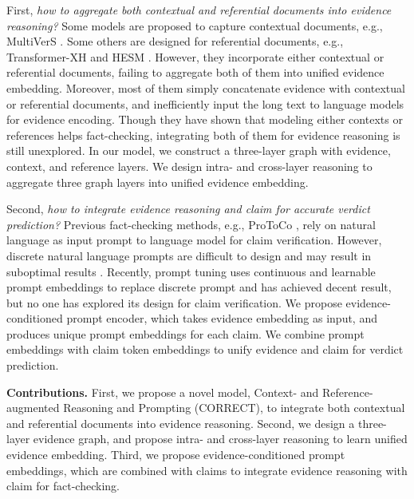 First, \emph{how to aggregate both contextual and referential documents into evidence reasoning?} Some models are proposed to capture contextual documents, e.g., MultiVerS \cite{multivers}. Some others are designed for referential documents, e.g., Transformer-XH \cite{transformer_xh} and HESM \cite{hesm}. However, they incorporate either contextual or referential documents, failing to aggregate both of them into unified evidence embedding. Moreover, most of them simply concatenate evidence with contextual or referential documents, and inefficiently input the long text to language models for evidence encoding. Though they have shown that modeling either contexts or references helps fact-checking, integrating both of them for evidence reasoning is still unexplored. In our model, we construct a three-layer graph with evidence, context, and reference layers. We design intra- and cross-layer reasoning to aggregate three graph layers into unified evidence embedding.

Second, \emph{how to integrate evidence reasoning and claim for accurate verdict prediction?} Previous fact-checking methods, e.g., ProToCo \cite{protoco}, rely on natural language as input prompt to language model for claim verification. However, discrete natural language prompts are difficult to design and may result in suboptimal results \cite{coop}. Recently, prompt tuning \cite{soft_prompting} uses continuous and learnable prompt embeddings to replace discrete prompt and has achieved decent result, but no one has explored its design for claim verification. We propose evidence-conditioned prompt encoder, which takes evidence embedding as input, and produces unique prompt embeddings for each claim. We combine prompt embeddings with claim token embeddings to unify evidence and claim for verdict prediction.

\textbf{Contributions.} First, we propose a novel model, Context- and Reference-augmented Reasoning and Prompting (CORRECT), to integrate both contextual and referential documents into evidence reasoning. Second, we design a three-layer evidence graph, and propose intra- and cross-layer reasoning to learn unified evidence embedding. Third, we propose evidence-conditioned prompt embeddings, which are combined with claims to integrate evidence reasoning with claim for fact-checking.